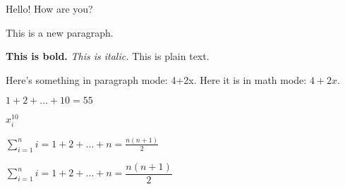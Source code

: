 \documentclass{article}
\begin{document}
    Hello!
    How are you?

    This is a new paragraph.

    \textbf{This is bold.} \textit{This is italic.} This is plain text.

    Here's something in paragraph mode: 4+2x.
    Here it is in math mode: $4+2x$.

    $1+2+\ldots+10 = 55$

    $x_{i}^{10}$

    $\sum_{i=1}^{n} i = 1 + 2 + \ldots + n = \frac{n(n+1)}{2}$

    $\sum\limits_{i=1}^{n} i = 1 + 2 + \ldots + n = \dfrac{n(n+1)}{2}$
\end{document}
